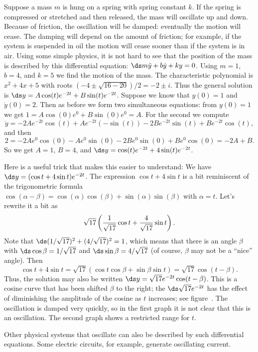 \begin{example} Suppose 
\label{example:damped spring oscillation}
a mass $m$ is hung on a spring with spring
constant $k$. If the spring is compressed or stretched and then
released, the mass will oscillate up and down. Because of friction,
the oscillation will be damped: eventually the motion will cease. The
damping will depend on the amount of friction; for example, if the
system is suspended in oil the motion will cease sooner than if the
system is in air. Using some simple physics, it is not hard to see
that the position of the mass is described by this differential
equation:
$\ds m\ddot y+b\dot y+ky=0$. Using $m=1$, $b=4$, and $k=5$ we find the
motion of the mass. The characteristic polynomial is 
$x^2+4x+5$ with roots $(-4\pm\sqrt{16-20})/2=-2\pm i$. Thus the
general solution is
$\ds y=A\cos(t)e^{-2t}+B\sin(t)e^{-2t}$.
Suppose we know that $y(0)=1$ and $\dot y(0)=2$. Then as before we
form two simultaneous equations: from $y(0)=1$ we get
$1=A\cos(0)e^0+B\sin(0)e^0=A$. For the second we compute
$$\ddot y=-2Ae^{-2t}\cos(t)+Ae^{-2t}(-\sin(t))-2Be^{-2t}\sin(t)+
Be^{-2t}\cos(t),$$
and then
$$2=-2Ae^0\cos(0)-Ae^0\sin(0)-2Be^0\sin(0)+Be^0\cos(0)
=-2A+B.$$
So we get $A=1$, $B=4$, and $\ds y=\cos(t)e^{-2t}+4\sin(t)e^{-2t}$.

Here is a useful trick that makes this easier to understand: We have
$\ds y=(\cos t+4\sin t)e^{-2t}$. The expression $\cos t+4 \sin t$ is a
bit reminiscent of the trigonometric formula
$\cos(\alpha-\beta)=\cos(\alpha)\cos(\beta)+\sin(\alpha)\sin(\beta)$
with $\alpha=t$.
Let's rewrite it a bit as
$$\sqrt{17}\left({1\over\sqrt{17}}\cos t + {4\over\sqrt{17}}\sin t\right).$$
Note that $\ds (1/\sqrt{17})^2+(4/\sqrt{17})^2=1$, 
which means that there is an angle
$\beta$ with $\ds \cos\beta=1/\sqrt{17}$ and 
$\ds \sin\beta=4/\sqrt{17}$ (of course, $\beta$ may not be a ``nice'' angle). Then
$$\cos t+4\sin t = \sqrt{17}\left(\cos t\cos \beta+\sin\beta\sin t\right)
=\sqrt{17}\cos(t-\beta).$$
Thus, the solution may also be written
$\ds y=\sqrt{17}e^{-2t}\cos(t-\beta)$.
This is a cosine curve  that has been shifted $\beta$ to the
right; the $\ds \sqrt{17}e^{-2t}$ has the effect of diminishing the
amplitude of the cosine as $t$ increases; see
figure~. The oscillation is damped very
quickly, so in the first graph it is not clear that this is an
oscillation. The second graph shows a restricted range for $t$.
\end{example}

Other physical systems that oscillate can also be described by such
differential equations. Some electric circuits, for example, generate
oscillating current.

